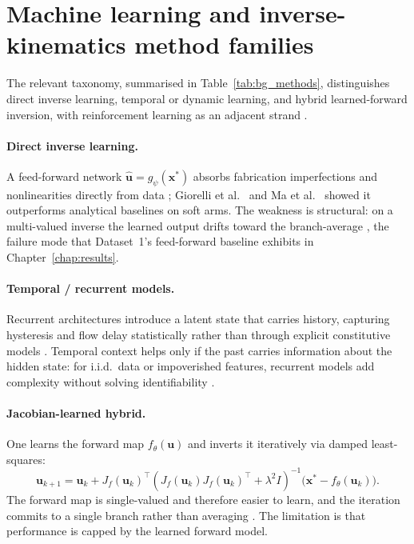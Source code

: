 \section{Machine learning and inverse-kinematics method families}
\label{sec:bg_ml_ik}

The relevant taxonomy, summarised in Table~\ref{tab:bg_methods}, distinguishes direct inverse learning, temporal or dynamic learning, and hybrid learned-forward inversion, with reinforcement learning as an adjacent strand \cite{thuruthel2018survey, kim2021mlsoft, wang2021mlsurvey}.

\paragraph{Direct inverse learning.}
\label{sec:bg_ik_direct}
A feed-forward network $\hat{\mathbf{u}} = g_{\psi}(\mathbf{x}^{\ast})$ absorbs fabrication imperfections and nonlinearities directly from data \cite{kim2021mlsoft, wang2021mlsurvey}; Giorelli et al.\ \cite{giorelli2015nn} and Ma et al.\ \cite{ma2022bp} showed it outperforms analytical baselines on soft arms. The weakness is structural: on a multi-valued inverse the learned output drifts toward the branch-average \cite{wang2021mlsurvey, fang2022jacobian}, the failure mode that Dataset~1's feed-forward baseline exhibits in Chapter~\ref{chap:results}.

\paragraph{Temporal / recurrent models.}
\label{sec:bg_ik_temporal}
Recurrent architectures introduce a latent state that carries history, capturing hysteresis and flow delay statistically rather than through explicit constitutive models \cite{thuruthel2019modelbased, tariverdi2021rnn}. Temporal context helps only if the past carries information about the hidden state: for i.i.d.\ data or impoverished features, recurrent models add complexity without solving identifiability \cite{wang2021mlsurvey, tariverdi2021rnn}.

\paragraph{Jacobian-learned hybrid.}
\label{sec:bg_ik_jac}
One learns the forward map $f_{\theta}(\mathbf{u})$ and inverts it iteratively via damped least-squares:
\begin{equation}
  \mathbf{u}_{k+1}
  = \mathbf{u}_{k}
    + J_{f}(\mathbf{u}_{k})^{\top} \left( J_{f}(\mathbf{u}_{k}) J_{f}(\mathbf{u}_{k})^{\top} + \lambda^{2} I \right)^{-1} \big( \mathbf{x}^{\ast} - f_{\theta}(\mathbf{u}_{k}) \big).
  \label{eq:bg_jacobian_update}
\end{equation}
The forward map is single-valued and therefore easier to learn, and the iteration commits to a single branch rather than averaging \cite{fang2022jacobian}. The limitation is that performance is capped by the learned forward model.

